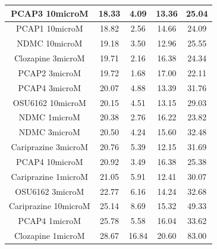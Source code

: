 \documentclass[a4paper,12pt]{article}
\begin{document}
\begin{table}[h!]
\begin{tabular}{|c|c|c|c|c|}
PCAP3 10microM      & 18.33 & 4.09  & 13.36 & 25.04 \\ \hline
PCAP1 10microM        & 18.82 & 2.56  & 14.66 & 24.09 \\ \hline
NDMC 10microM         & 19.18 & 3.50   & 12.96 & 25.55 \\ \hline
Clozapine 3microM     & 19.71 & 2.16  & 16.38 & 24.34 \\ \hline
PCAP2 3microM         & 19.72 & 1.68  & 17.00    & 22.11 \\ \hline
PCAP4 3microM       & 20.07 & 4.88  & 13.39 & 31.76 \\ \hline
OSU6162 10microM      & 20.15 & 4.51  & 13.15 & 29.03 \\ \hline
NDMC 1microM          & 20.38 & 2.76  & 16.22 & 23.82 \\ \hline
NDMC 3microM          & 20.50  & 4.24  & 15.60  & 32.48 \\ \hline
Cariprazine 3microM   & 20.76 & 5.39  & 12.15 & 31.69 \\ \hline
PCAP4 10microM      & 20.92 & 3.49  & 16.38 & 25.38 \\ \hline
Cariprazine 1microM   & 21.05 & 5.91  & 12.41 & 30.07 \\ \hline
OSU6162 3microM       & 22.77 & 6.16  & 14.24 & 32.68 \\ \hline
Cariprazine 10microM  & 25.14 & 8.69  & 15.32 & 49.33 \\ \hline
PCAP4 1microM       & 25.78 & 5.58  & 16.04 & 33.62 \\ \hline
Clozapine 1microM     & 28.67 & 16.84 & 20.60  & 83.00    \\\hline
\end{tabular}
\end{table}
\newpage
\end{document}
